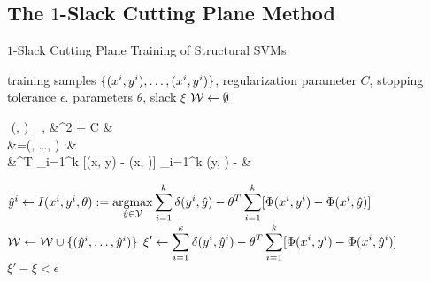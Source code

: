 \subsection{The $1$-Slack Cutting Plane Method}

\begin{algorithm*}[t]
    \caption{$1$-Slack Cutting Plane Training of Structural SVMs \label{alg_one_slack}}
    \begin{algorithmic}[1]
        \Require training samples $\{ (x^{i}, y^{i}), \dots, (x^{i}, y^{i})\}$, regularization parameter $C$, stopping tolerance $\epsilon$.
        \Ensure parameters $\theta$, slack $\xi$
        \State $\mathcal{W} \leftarrow \emptyset$
        \Repeat
            \State 
            \vspace{-5mm}
            \begin{flalign*}
                \quad\,\,(\theta, \xi) \leftarrow \displaystyle \argmin_{\theta, \xi}&^2 + C \xi&\\
                &\forall {}=(, \dots, ) \in \W:&\\
                            &\theta^T \sum_{i=1}^k [\Phi(x, y) - \Phi(x, )] \geq \sum_{i=1}^k \delta(y, ) - \xi&
            \end{flalign*}
                \State
                $\hat{y}^{i} \leftarrow I(x^{i}, y^{i}, \theta) := \displaystyle \operatorname*{argmax}_{\hat{y}\in\mathcal{Y}} \sum_{i=1}^k \delta(y^{i}, \hat{y}) - \theta^T \sum_{i=1}^k [\Phi(x^{i}, y^{i}) - \Phi(x^{i}, \hat{y})]$ \label{get_cutting_plane}
            \EndFor
            \State $\mathcal{W} \leftarrow \mathcal{W} \cup \{ (\hat{y}^{i}, \dots, \hat{y}^{i}) \} $
            \State $ \displaystyle \xi' \leftarrow  \sum_{i=1}^k \delta(y^{i}, \hat{y}^{i}) - \theta^T \sum_{i=1}^k [\Phi(x^{i}, y^{i}) - \Phi(x^{i}, \hat{y}^{i})] $
        \Until $\xi' - \xi < \epsilon$ \label{convergence_check}
    \end{algorithmic}
\end{algorithm*}

